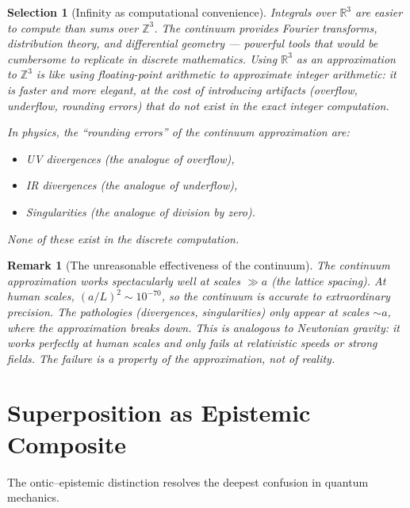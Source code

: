 \documentclass[11pt]{article}
\theoremstyle{tight}
\theoremstyle{plainroman}
\newtheorem{selection}[theorem]{Selection}
\newtheorem{remark}[theorem]{Remark}
\newcommand{\R}{\mathbb{R}}
\newcommand{\Z}{\mathbb{Z}}
\begin{document}
\begin{selection}[Infinity as computational convenience]
Integrals over $\R^3$ are easier to compute than sums over $\Z^3$.
The continuum provides Fourier transforms, distribution theory, and differential geometry --- powerful tools that would be cumbersome to replicate in discrete mathematics.
Using $\R^3$ as an approximation to $\Z^3$ is like using floating-point arithmetic to approximate integer arithmetic: it is faster and more elegant, at the cost of introducing artifacts (overflow, underflow, rounding errors) that do not exist in the exact integer computation.

In physics, the ``rounding errors'' of the continuum approximation are:
\begin{itemize}[nosep]
\item UV divergences (the analogue of overflow),
\item IR divergences (the analogue of underflow),
\item Singularities (the analogue of division by zero).
\end{itemize}
None of these exist in the discrete computation.
\end{selection}

\begin{remark}[The unreasonable effectiveness of the continuum]
The continuum approximation works spectacularly well at scales $\gg a$ (the lattice spacing).
At human scales, $(a/L)^2\sim 10^{-70}$, so the continuum is accurate to extraordinary precision.
The pathologies (divergences, singularities) only appear at scales $\sim a$, where the approximation breaks down.
This is analogous to Newtonian gravity: it works perfectly at human scales and only fails at relativistic speeds or strong fields.
The failure is a property of the approximation, not of reality.
\end{remark}

\section{Superposition as Epistemic Composite}

The ontic--epistemic distinction resolves the deepest confusion in quantum mechanics.
\end{document}
